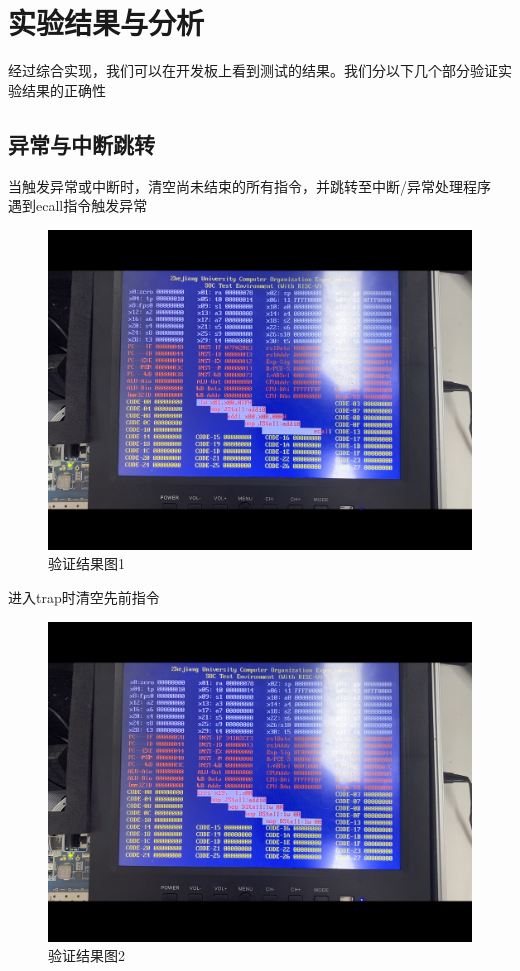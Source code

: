 \section{实验结果与分析}
经过综合实现，我们可以在开发板上看到测试的结果。我们分以下几个部分验证实验结果的正确性
\subsection{异常与中断跳转}
当触发异常或中断时，清空尚未结束的所有指令，并跳转至中断/异常处理程序\\
遇到ecall指令触发异常
\begin{figure}[H] %
	\centering %
	\includegraphics[width=1.0\textwidth]{figs/7.png} %
	\caption{验证结果图1} %
	\label{Fig.19} %
\end{figure}
进入trap时清空先前指令
\begin{figure}[H] %
	\centering %
	\includegraphics[width=1.0\textwidth]{figs/8.png} %
	\caption{验证结果图2} %
	\label{Fig.20} %
\end{figure}
